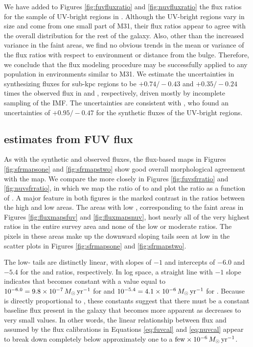 \documentclass[iop, tighten]{emulateapj}
\begin{document}
We have added to Figures \ref{fig:fuvfluxratio} and \ref{fig:nuvfluxratio} the
flux ratios for the sample of UV-bright regions in \citet{Simones:2014}.
Although the UV-bright regions vary in size and come from one small part of
M31, their flux ratios appear to agree with the overall distribution for the
rest of the galaxy. Also, other than the increased variance in the faint areas,
we find no obvious trends in the mean or variance of the flux ratios with
respect to environment or distance from the bulge. Therefore, we conclude that
the flux modeling procedure may be successfully applied to any population in
environments similar to M31. We estimate the uncertainties in synthesizing
fluxes for sub-kpc regions to be $+\!0.74/\!-\!0.43$ and $+\!0.35/\!-\!0.24$
times the observed flux in \fuv{} and \nuv{}, respectively, driven mostly by
incomplete sampling of the IMF. The \ffuvsfh{} uncertainties are consistent
with \citet{Simones:2014}, who found an uncertainties of $+\!0.95/\!-\!0.47$
for the synthetic \fuv{} fluxes of the UV-bright regions.



\subsection{\sfr{} estimates from FUV flux}

\figfuvsfrratio

\fignuvsfrratio

As with the synthetic and observed fluxes, the flux-based \sfr{} maps in
Figures \ref{fig:sfrmapsone} and \ref{fig:sfrmapstwo} show good overall
morphological agreement with the \sfroneh{} map. We compare the  more
closely in Figures \ref{fig:fuvsfrratio} and \ref{fig:nuvsfrratio}, in which we
map the ratio of \sfrx{} to \sfroneh{} and plot the \sfr{} ratio as a function
of \sfroneh{}. A major feature in both figures is the marked contrast in the
\sfr{} ratios between the high and low \sfr{} areas. The areas with low
\sfroneh{}, corresponding to the faint areas in Figures \ref{fig:fluxmapsfuv}
and \ref{fig:fluxmapsnuv}, host nearly all of the very highest \sfr{} ratios in
the entire survey area and none of the low or moderate ratios. The pixels in
these areas make up the downward sloping tails seen at low \sfroneh{} in the
scatter plots in Figures \ref{fig:sfrmapsone} and \ref{fig:sfrmapstwo}.

The low-\sfr{} tails are distinctly linear, with slopes of $-1$ and intercepts
of $-6.0$ and $-5.4$ for the \fuv{} and \nuv{} \sfr{} ratios, respectively. In
log space, a straight line with $-1$ slope indicates that \sfrx{} becomes
constant with a value equal to $10^{-6.0} = 9.8\times 10^{-7}\,M_\odot\,\mathrm{yr}^{-1}$ for
\fuv{} and $10^{-5.4} = 4.1\times 10^{-6}\,M_\odot\,\mathrm{yr}^{-1}$ for \nuv{}. Because
\sfrx{} is directly proportional to \fxobs{}, these \sfr{} constants suggest
that there must be a constant baseline flux present in the galaxy that becomes
more apparent as \sfroneh{} decreases to very small values. In other words, the
linear relationship between flux and \sfr{} assumed by the flux calibrations in
Equations \ref{eq:fuvcal} and \ref{eq:nuvcal} appear to break down completely
below \sfroneh{} approximately one to a $\mathrm{few} \times
10^{-6}\,M_\odot\,\mathrm{yr}^{-1}$.
\end{document}

